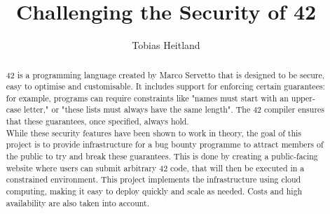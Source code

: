 \documentclass[11pt
              , a4paper
              , twoside
              , openright
              , table
              ]{report}
\title{Challenging the Security of 42}
\author{Tobias Heitland}
\date{}
\begin{document}
\frontmatter



\begin{abstract}

42 is a programming language created by Marco Servetto that is designed to be secure, easy to optimise and customisable. It includes support for enforcing certain guarantees: for example, programs can require constraints like "names must start with an upper-case letter," or "these lists must always have the same length". The 42 compiler ensures that these guarantees, once specified, always hold.
\\[12pt]
While these security features have been shown to work in theory, the goal of this project is to provide infrastructure for a bug bounty programme to attract members of the public to try and break these guarantees. This is done by creating a public-facing website where users can submit arbitrary 42 code, that will then be executed in a constrained environment. This project implements the infrastructure using cloud computing, making it easy to deploy quickly and scale as needed. Costs and high availability are also taken into account.

\end{abstract}


\maketitle

%

\tableofcontents



\mainmatter


%
%
%
%




\backmatter



%


\end{document}
